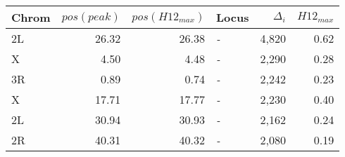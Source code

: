 \begin{tabular}{lrrlrr}
\toprule
Chrom & $pos(peak)$ & $pos(H12_{max})$ &       Locus & $\Delta_{i}$ & $H12_{max}$ \\
\midrule
   2L &       26.32 &            26.38 &  \textit{-} &        4,820 &        0.62 \\
    X &        4.50 &             4.48 &  \textit{-} &        2,290 &        0.28 \\
   3R &        0.89 &             0.74 &  \textit{-} &        2,242 &        0.23 \\
    X &       17.71 &            17.77 &  \textit{-} &        2,230 &        0.40 \\
   2L &       30.94 &            30.93 &  \textit{-} &        2,162 &        0.24 \\
   2R &       40.31 &            40.32 &  \textit{-} &        2,080 &        0.19 \\
\bottomrule
\end{tabular}
